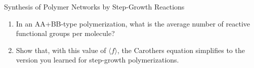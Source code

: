 \begin{activity}[extension]{Synthesis of Polymer Networks by Step-Growth Reactions}
\begin{exercises}
		\begin{enumerate}
			\item In an AA+BB-type polymerization, what is the average number of reactive functional groups per molecule?
			
				\begin{solution}\end{solution}
			
			\item Show that, with this value of $\langle f\rangle$, the Carothers equation simplifies to the version you learned for step-growth polymerizations.
			
				\begin{solution}\end{solution}
		\end{enumerate}	
	
\end{exercises}


%
%	


	
\end{activity}